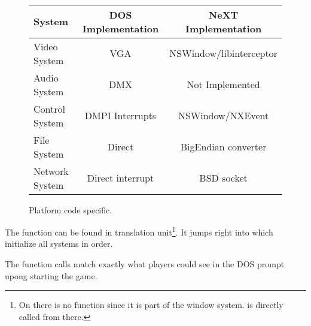\\
\par
 \begin{figure}[H]
\centering  
\begin{tabularx}{\textwidth}{ L{0.22} | C{0.39} | C{0.39} }
  \toprule
  \textbf{System} & \textbf{DOS Implementation} & \textbf{NeXT Implementation}\\
  \toprule 
    Video System & VGA & NSWindow/libinterceptor\\
    Audio System & DMX & Not Implemented\\
    Control System & DMPI Interrupts & NSWindow/NXEvent \\
    File  System & Direct & BigEndian converter\\
    Network System & Direct interrupt & BSD socket \\
   \toprule
\end{tabularx}
\caption{Platform code specific.}
\end{figure}

\par


The  function can be found in  translation unit\footnote{On \NeXT there is no  function since it is part of the window system.  is directly called from there.}. It jumps right into  which initialize all systems in order.\\
\par
{}
\pagebreak

The function calls match exactly what players could see in the DOS prompt upong starting the game.\\
\par
{}
\par
{}

